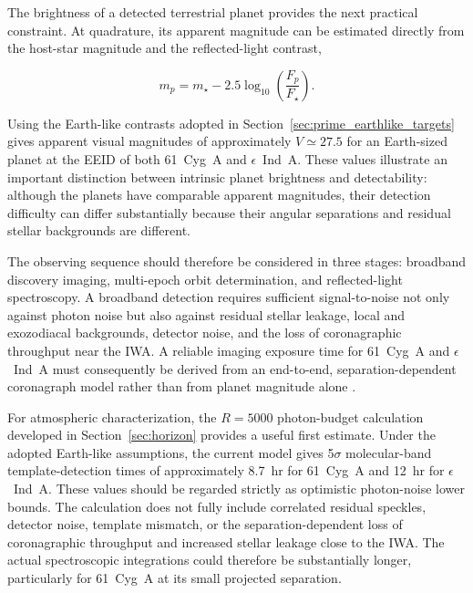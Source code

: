 The brightness of a detected terrestrial planet provides the next practical
constraint. At quadrature, its apparent magnitude can be estimated directly
from the host-star magnitude and the reflected-light contrast,

\begin{equation}
m_p
=
m_\star
-
2.5\log_{10}
\left(
\frac{F_p}{F_\star}
\right).
\label{eq:planet_magnitude}
\end{equation}

Using the Earth-like contrasts adopted in Section~\ref{sec:prime_earthlike_targets} 
gives apparent visual magnitudes of approximately $V\simeq27.5$ for an 
Earth-sized planet at the EEID of both 61~Cyg~A and $\epsilon$~Ind~A. 
These values illustrate an important distinction between intrinsic planet 
brightness and detectability: although the planets have comparable apparent 
magnitudes, their detection difficulty can differ substantially because 
their angular separations and residual stellar backgrounds are different.

The observing sequence should therefore be considered in three stages:
broadband discovery imaging, multi-epoch orbit determination, and
reflected-light spectroscopy. A broadband detection requires sufficient
signal-to-noise not only against photon noise but also against residual
stellar leakage, local and exozodiacal backgrounds, detector noise, and
the loss of coronagraphic throughput near the IWA. A reliable imaging
exposure time for 61~Cyg~A and $\epsilon$~Ind~A must consequently be derived
from an end-to-end, separation-dependent coronagraph model rather than from
planet magnitude alone \cite{nemati23,krist23}.

For atmospheric characterization, the $R=5000$ photon-budget calculation
developed in Section~\ref{sec:horizon} provides a useful first estimate. Under the adopted
Earth-like assumptions, the current model gives 5$\sigma$ molecular-band
template-detection times of approximately 8.7~hr for 61~Cyg~A and 12~hr for
$\epsilon$~Ind~A. These values should be regarded strictly as optimistic
photon-noise lower bounds. The calculation does not fully include correlated
residual speckles, detector noise, template mismatch, or the
separation-dependent loss of coronagraphic throughput and increased stellar
leakage close to the IWA. The actual spectroscopic integrations could
therefore be substantially longer, particularly for 61~Cyg~A at its small
projected separation.

